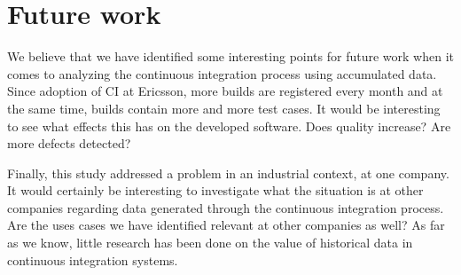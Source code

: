 
\section{Future work}
We believe that we have identified some interesting points for future work when it comes to analyzing the continuous integration process using accumulated data. Since adoption of CI at Ericsson, more builds are registered every month and at the same time, builds contain more and more test cases. It would be interesting to see what effects this has on the developed software. Does quality increase? Are more defects detected? 

Finally, this study addressed a problem in an industrial context, at one company. It would certainly be interesting to investigate what the situation is at other companies regarding data generated through the continuous integration process. Are the uses cases we have identified relevant at other companies as well? As far as we know, little research has been done on the value of historical data in continuous integration systems.

